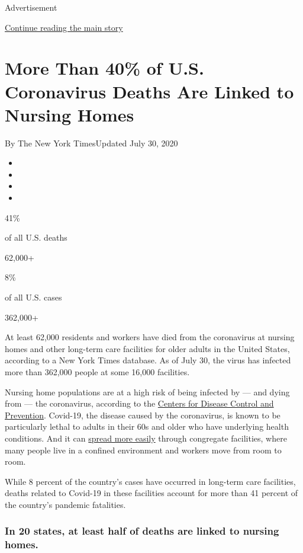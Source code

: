 Advertisement

\protect\hyperlink{after-top}{Continue reading the main story}

\hypertarget{more-than-40-of-us-coronavirus-deaths-are-linked-to-nursing-homes}{%
\section{More Than 40\% of U.S. Coronavirus Deaths Are Linked to Nursing
Homes}\label{more-than-40-of-us-coronavirus-deaths-are-linked-to-nursing-homes}}

By The New York TimesUpdated July 30, 2020

\begin{itemize}
\item
\item
\item
\item
\end{itemize}

41\%

of all U.S. deaths

62,000+

8\%

of all U.S. cases

362,000+

At least 62,000 residents and workers have died from the coronavirus at
nursing homes and other long-term care facilities for older adults in
the United States, according to a New York Times database. As of July
30, the virus has infected more than 362,000 people at some 16,000
facilities.

Nursing home populations are at a high risk of being infected by --- and
dying from --- the coronavirus, according to the
\href{https://www.cdc.gov/coronavirus/2019-ncov/hcp/long-term-care.html}{Centers
for Disease Control and Prevention}. Covid-19, the disease caused by the
coronavirus, is known to be particularly lethal to adults in their 60s
and older who have underlying health conditions. And it can
\href{https://www.nytimes3xbfgragh.onion/2020/04/17/us/coronavirus-nursing-homes.html}{spread
more easily} through congregate facilities, where many people live in a
confined environment and workers move from room to room.

While 8 percent of the country's cases have occurred in long-term care
facilities, deaths related to Covid-19 in these facilities account for
more than 41 percent of the country's pandemic fatalities.

\hypertarget{in-20-states-at-least-half-of-deaths-are-linked-to-nursing-homes}{%
\subsubsection{In 20 states, at least half of deaths are linked to
nursing
homes.}\label{in-20-states-at-least-half-of-deaths-are-linked-to-nursing-homes}}

